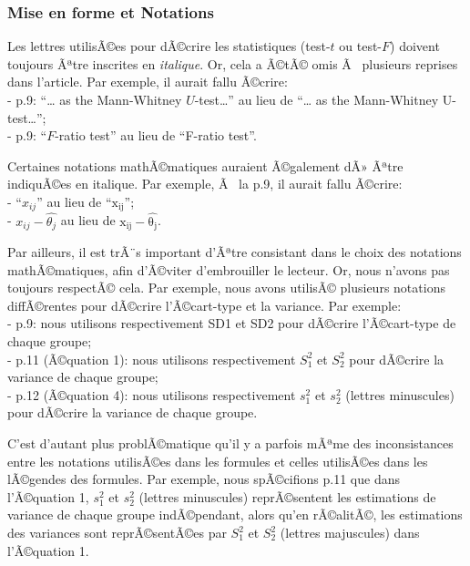 \begin{appendix}
\hypertarget{mise-en-forme-et-notations}{%
\subsubsection{Mise en forme et
Notations}\label{mise-en-forme-et-notations}}

Les lettres utilisÃ©es pour dÃ©crire les statistiques (test-\(t\) ou
test-\(F\)) doivent toujours Ãªtre inscrites en \emph{italique}. Or,
cela a Ã©tÃ© omis Ã~ plusieurs reprises dans l'article. Par exemple, il
aurait fallu Ã©crire:\\
- p.9: ``\ldots{} as the Mann-Whitney \(U\)-test\ldots{}'' au lieu de
``\ldots{} as the Mann-Whitney U-test\ldots{}'';\\
- p.9: ``\(F\)-ratio test'' au lieu de ``F-ratio test''.

Certaines notations mathÃ©matiques auraient Ã©galement dÃ» Ãªtre
indiquÃ©es en italique. Par exemple, Ã~ la p.9, il aurait fallu
Ã©crire:\\
- ``\(x_{ij}\)'' au lieu de ``\(\mathrm{x_{ij}}\)'';\\
- \textbar{}\(x_{ij}-\hat{\theta_j}\)\textbar{} au lieu de
\textbar{}\(\mathrm{x_{ij}-\hat{\theta_j}}\)\textbar.

Par ailleurs, il est trÃ¨s important d'Ãªtre consistant dans le choix
des notations mathÃ©matiques, afin d'Ã©viter d'embrouiller le lecteur.
Or, nous n'avons pas toujours respectÃ© cela. Par exemple, nous avons
utilisÃ© plusieurs notations diffÃ©rentes pour dÃ©crire l'Ã©cart-type et
la variance. Par exemple:\\
- p.9: nous utilisons respectivement SD1 et SD2 pour dÃ©crire
l'Ã©cart-type de chaque groupe;\\
- p.11 (Ã©quation 1): nous utilisons respectivement \(S^2_1\) et
\(S^2_2\) pour dÃ©crire la variance de chaque groupe;\\
- p.12 (Ã©quation 4): nous utilisons respectivement \(s^2_1\) et
\(s^2_2\) (lettres minuscules) pour dÃ©crire la variance de chaque
groupe.

C'est d'autant plus problÃ©matique qu'il y a parfois mÃªme des
inconsistances entre les notations utilisÃ©es dans les formules et
celles utilisÃ©es dans les lÃ©gendes des formules. Par exemple, nous
spÃ©cifions p.11 que dans l'Ã©quation 1, \(s^2_1\) et \(s^2_2\) (lettres
minuscules) reprÃ©sentent les estimations de variance de chaque groupe
indÃ©pendant, alors qu'en rÃ©alitÃ©, les estimations des variances sont
reprÃ©sentÃ©es par \(S^2_1\) et \(S^2_2\) (lettres majuscules) dans
l'Ã©quation 1.


\end{appendix}
